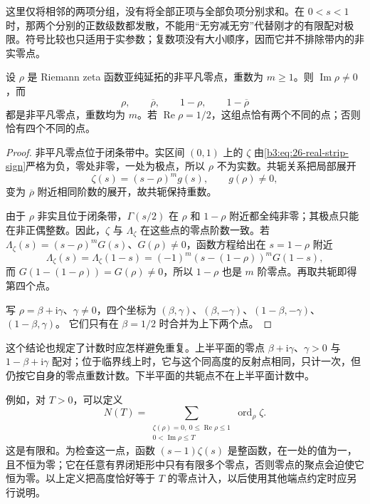 这里仅将相邻的两项分组，没有将全部正项与全部负项分别求和。在 \(0<s<1\) 时，那两个分别的正数级数都发散，不能用“无穷减无穷”代替刚才的有限配对极限。符号比较也只适用于实参数；复数项没有大小顺序，因而它并不排除带内的非实零点。

\begin{proposition}[非平凡零点的对称与重数]\label{b3:prop:26-zero-symmetry}
设 \(\rho\) 是 Riemann zeta 函数亚纯延拓的非平凡零点，重数为 \(m\ge1\)。则 \(\operatorname{Im}\rho\ne0\)，而
\[
 \rho,\qquad \overline\rho,\qquad
 1-\rho,\qquad 1-\overline\rho
\]
都是非平凡零点，重数均为 \(m\)。若 \(\operatorname{Re}\rho=1/2\)，这组点恰有两个不同的点；否则恰有四个不同的点。
\end{proposition}
\begin{proof}
非平凡零点位于闭条带中。实区间 \((0,1)\) 上的 \(\zeta\) 由\eqref{b3:eq:26-real-strip-sign}严格为负，零处非零，一处为极点，所以 \(\rho\) 不为实数。共轭关系把局部展开
\[
 \zeta(s)=(s-\rho)^m g(s),\qquad g(\rho)\ne0,
\]
变为 \(\overline\rho\) 附近相同阶数的展开，故共轭保持重数。

由于 \(\rho\) 非实且位于闭条带，\(\Gamma(s/2)\) 在 \(\rho\) 和 \(1-\rho\) 附近都全纯非零；其极点只能在非正偶整数。因此，\(\zeta\) 与 \(\Lambda_\zeta\) 在这些点的零点阶数一致。若 \(\Lambda_\zeta(s)=(s-\rho)^m G(s)\)、\(G(\rho)\ne0\)，函数方程给出在 \(s=1-\rho\) 附近
\[
 \Lambda_\zeta(s)=\Lambda_\zeta(1-s)
 =(-1)^m(s-(1-\rho))^mG(1-s),
\]
而 \(G(1-(1-\rho))=G(\rho)\ne0\)，所以 \(1-\rho\) 也是 \(m\) 阶零点。再取共轭即得第四个点。

写 \(\rho=\beta+\mathrm i\gamma\)、\(\gamma\ne0\)，四个坐标为
\((\beta,\gamma)\)、\((\beta,-\gamma)\)、\((1-\beta,-\gamma)\)、\((1-\beta,\gamma)\)。
它们只有在 \(\beta=1/2\) 时合并为上下两个点。
\end{proof}

这个结论也规定了计数时应怎样避免重复。上半平面的零点 \(\beta+\mathrm i\gamma\)、\(\gamma>0\) 与 \(1-\beta+\mathrm i\gamma\) 配对；位于临界线上时，它与这个同高度的反射点相同，只计一次，但仍按它自身的零点重数计数。下半平面的共轭点不在上半平面计数中。

例如，对 \(T>0\)，可以定义
\[
 N(T)=
 \sum_{\substack{\zeta(\rho)=0,\ 0\le\operatorname{Re}\rho\le1\\
                 0<\operatorname{Im}\rho\le T}}
       \operatorname{ord}_\rho\zeta.
\]
这是有限和。为检查这一点，函数 \((s-1)\zeta(s)\) 是整函数，在一处的值为一，且不恒为零；它在任意有界闭矩形中只有有限多个零点，否则零点的聚点会迫使它恒为零。以上定义把高度恰好等于 \(T\) 的零点计入，以后使用其他端点约定时应另行说明。

